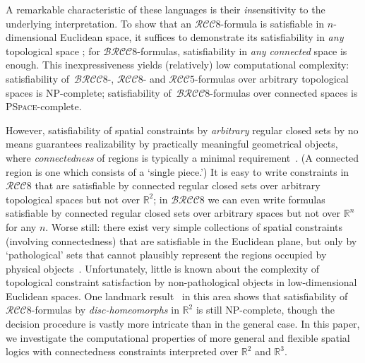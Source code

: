 \documentclass{article}
\newcommand{\NP}{\textsc{NP}}
\newcommand{\PSpace}{\textsc{PSpace}}
\newcommand{\RCCE}{\ensuremath{\mathcal{RCC}8}}\newcommand{\RCCF}{\ensuremath{\mathcal{RCC}5}}\newcommand{\BRCCE}{\ensuremath{\mathcal{BRCC}8}}\newcommand{\RCCEc}{\ensuremath{\RCCE{}c}}\newcommand{\RCCEci}{\ensuremath{\RCCE{}c^\circ}}\newcommand{\cBCc}{\ensuremath{\mathcal{C}c}}\newcommand{\cBCci}{\ensuremath{\mathcal{C}c^\circ}}
\newcommand{\R}{\mathbb{R}}
\begin{document}
A remarkable characteristic of these languages is their
\emph{in}sensitivity to the underlying interpretation.  To show that an
\RCCE-formula is satisfiable in $n$-dimensional Euclidean space, it
suffices to demonstrate its satisfiability in {\em any} topological
space \cite{ijcai:Renz98}; for \BRCCE-formulas, satisfiability in
\emph{any connected} space is enough. This inexpressiveness yields
(relatively) low computational complexity: satisfiability
of~\BRCCE-, \RCCE- and \RCCF-formulas over arbitrary topological
spaces is \NP-complete; satisfiability of~\BRCCE{}-formulas over
connected spaces is \PSpace-complete.

However, satisfiability of spatial constraints by {\em arbitrary}
regular closed sets by no means guarantees realizability by
practically meaningful geometrical objects, where {\em connectedness}
of regions is typically a minimal
requirement~\cite{Borgo96,ijcai:Cohn&Renz08}.  (A connected region is
one which consists of a `single piece.')  It is easy to write
constraints in $\RCCE$ that are satisfiable by connected regular
closed sets over arbitrary topological spaces but not over $\R^2$; in
$\BRCCE$ we can even write formulas satisfiable by connected regular
closed sets over arbitrary spaces but not over $\R^n$ for any $n$.
Worse still: there exist very simple collections of spatial
constraints (involving connectedness) that are satisfiable in the
Euclidean plane, but only by `pathological' sets that cannot plausibly
represent the regions occupied by physical objects~\cite{ijcai:HSL2}.
Unfortunately, little is known about the complexity of topological
constraint satisfaction by non-pathological objects in low-dimensional
Euclidean spaces. One landmark result~\cite{ijcai:iscloes:sss03} in
this area shows that satisfiability of \RCCE-formulas by
\emph{disc-homeomorphs} in $\R^2$ is still \NP-complete, though the
decision procedure is vastly more intricate than in the general
case. In this paper, we investigate the computational properties of
more general and flexible spatial logics with connectedness
constraints interpreted over $\R^2$ and $\R^3$.
\end{document}
